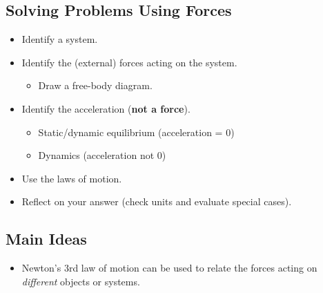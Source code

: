 \documentclass[]{article}
\begin{document}
\newpage
\begin{TeacherMargin}

\end{TeacherMargin}
\begin{PresentSpace}
\vspace{-10pt}
\section*{Solving Problems Using Forces}
\vspace{-10pt}
\begin{itemize}
	\item Identify a system.
	\item Identify the (external) forces acting on the system.
	\begin{itemize}
		\item Draw a free-body diagram.
	\end{itemize}
	\item Identify the acceleration (\textbf{not a force}).
	\begin{itemize}
		\item Static/dynamic equilibrium (acceleration = 0)
		\item Dynamics (acceleration not 0)
	\end{itemize}
	\item Use the laws of motion.
	\item Reflect on your answer (check units and evaluate special cases).
\end{itemize}
\end{PresentSpace}
\newpage
\begin{TeacherMargin}
	
\end{TeacherMargin}
\begin{PresentSpace}
\section*{Main Ideas}
\begin{itemize}
	\item Newton's 3rd law of motion can be used to relate the forces acting on \textit{different} objects or systems.
\end{itemize}
\end{PresentSpace}
\end{document}
